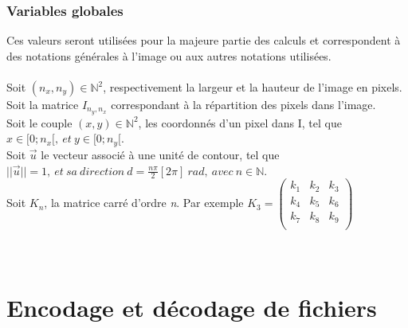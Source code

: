 \documentclass{article}
\newcommand{\N}{\mathbb{N}} %
\begin{document}
	\section{Variables globales}
		Ces valeurs seront utilisées pour la majeure partie des calculs et correspondent à des notations générales à l'image ou aux autres notations utilisées.\\\\
		\noindent
		Soit \begin{math}(n_x, n_y)\in\N^2\end{math}, respectivement la largeur et la hauteur de l'image en pixels.\\
		Soit la matrice \begin{math}I_{n_y, n_x}\end{math} correspondant à la répartition des pixels dans l'image.\\
		Soit le couple \begin{math}(x,y)\in\N^2\end{math}, les coordonnés d'un pixel dans I, tel que \begin{math}x\in[0;n_x[,\ et\ y\in[0;n_y[\end{math}.\\
		Soit \begin{math}\vec{u}\end{math} le vecteur associé à une unité de contour, tel que \begin{math}||\vec{u}|| = 1,\ et\ sa\ direction\ d =\frac{n\pi}{2}[2\pi]\ rad,\ avec\ n\in\N\end{math}.\\
		Soit \begin{math}K_n\end{math}, la matrice carré d'ordre \emph{n}. Par exemple \begin{math}K_3 = \begin{pmatrix}k_1&k_2&k_3\\k_4&k_5&k_6\\k_7&k_8&k_9\\\end{pmatrix}\end{math}\\\\\\
	\newpage


	
	\part*{Encodage et décodage de fichiers}
		
\end{document}
